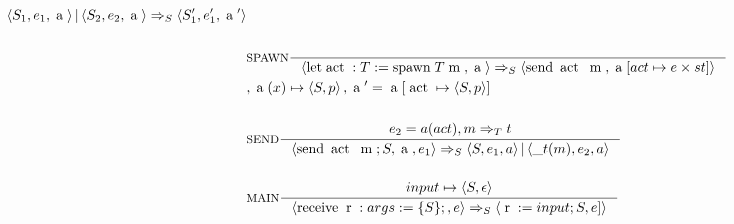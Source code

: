 \begin{align*}
                           {\Braket{S_1,e_1,\Ta}|\Braket{S_2,e_2,\Ta} \Rightarrow_S \Braket{S_1',e_1',\Ta'}}
\\\\
&\inference[$\text{SPAWN}$]{}
                       {\Braket{\Tlet \Tact:T := \Tspawn \; T \Tm,\Ta} \Rightarrow_S \Braket{\Tsend \Tact \Tm,\Ta[act \mapsto e \times st]}}
\\
&												{, \Ta(x) \mapsto \Braket{S,p} , \Ta' = \Ta[\Tact \mapsto \Braket{S, p}]}
\\\\
&\inference[$\text{SEND}$]{e_2 = a(act),m \Rightarrow_T t}
                       {\Braket{\Tsend \Tact \Tm ; S,\Ta,e_1} \Rightarrow_S \Braket{S,e_1,a}|\Braket{\_t(m),e_2,a}}
\\\\
&\inference[$\text{MAIN}$]{input \mapsto \Braket{S,\epsilon}}
                          {\Braket{\Treceive \Tr:args := \{S\};,e} \Rightarrow_S \Braket{\Tr := input;S, e]}}
\end{align*}
